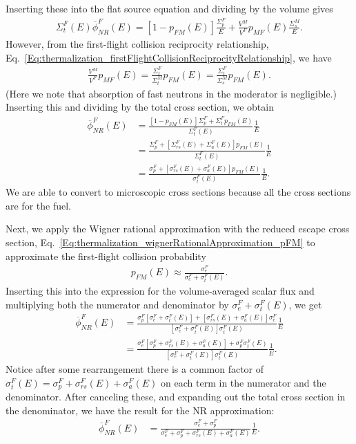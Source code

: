 Inserting these into the flat source equation and dividing by the volume gives
\begin{align}
   \Sigma_t^F(E) \overline{\phi}^F_{NR}(E) = [ 1 - p_{FM}(E) ]  \frac{\Sigma_p^F}{E} + \frac{V^M}{V^F} p_{MF}(E) \frac{\Sigma_s^M}{E}.
\end{align}
However, from the first-flight collision reciprocity relationship, Eq.~\eqref{Eq:thermalization_firstFlightCollisionReciprocityRelationship}, we have
\begin{align}
  \frac{V^M}{V^F} p_{MF}(E) = \frac{\Sigma_t^F}{\Sigma_t^M} p_{FM}(E) = \frac{\Sigma_t^F}{\Sigma_s^M} p_{FM}(E) . \nonumber
\end{align}
(Here we note that absorption of fast neutrons in the moderator is negligible.) Inserting this and dividing by the total cross section, we obtain
\begin{align}
  \overline{\phi}^F_{NR}(E) 
  &= \frac{ [ 1 - p_{FM}(E) ] \Sigma_p^F + \Sigma_t^F p_{FM}(E) }{ \Sigma_t^F(E) } \frac{1}{E} \nonumber \\
  &= \frac{ \Sigma_p^F + [ \Sigma_{rs}^F(E) + \Sigma_a^F(E) ] p_{FM}(E) }{ \Sigma_t^F(E) } \frac{1}{E} \nonumber \\
  &= \frac{ \sigma_p^F + [ \sigma_{rs}^F(E) + \sigma_a^F(E) ] p_{FM}(E) }{ \sigma_t^F(E) } \frac{1}{E} .
\end{align}
We are able to convert to microscopic cross sections because all the cross sections are for the fuel.

Next, we apply the Wigner rational approximation with the reduced escape cross section, Eq.~\eqref{Eq:thermalization_wignerRationalApproximation_pFM} to approximate the first-flight collision probability
\begin{align}
  p_{FM}(E) \approx \frac{ \sigma_e^F }{ \sigma_e^F + \sigma_t^F(E) } . \nonumber
\end{align}
Inserting this into the expression for the volume-averaged scalar flux and multiplying both the numerator and denominator by $\sigma_e^F + \sigma_t^F(E)$, we get
\begin{align}
  \overline{\phi}^F_{NR}(E) 
  &= \frac{ \sigma_p^F [ \sigma_e^F + \sigma_t^F(E) ]  + [ \sigma_{rs}^F(E) + \sigma_a^F(E) ] \sigma_e^F }{ [ \sigma_e^F + \sigma_t^F(E) ] \sigma_t^F(E)  } \frac{1}{E}  \nonumber \\
  &= \frac{ \sigma_e^F [ \sigma_p^F + \sigma_{rs}^F(E) + \sigma_a^F(E) ] + \sigma_p^F \sigma_t^F(E) }{ [ \sigma_e^F + \sigma_t^F(E) ] \sigma_t^F(E)  } \frac{1}{E} . \nonumber
\end{align}
Notice after some rearrangement there is a common factor of $\sigma_t^F(E) = \sigma_p^F + \sigma_{rs}^F(E) + \sigma_a^F(E)$ on each term in the numerator and the denominator. After canceling these, and expanding out the total cross section in the denominator, we have the result for the NR approximation:
\begin{align}
  \overline{\phi}^F_{NR}(E) 
  &= \frac{ \sigma_e^F + \sigma_p^F }{ \sigma_e^F + \sigma_p^F  + \sigma_{rs}^F(E) + \sigma_a^F(E) } \frac{1}{E} . \label{Eq:thermalization_flatSourceScalarFlux_NR}
\end{align}

